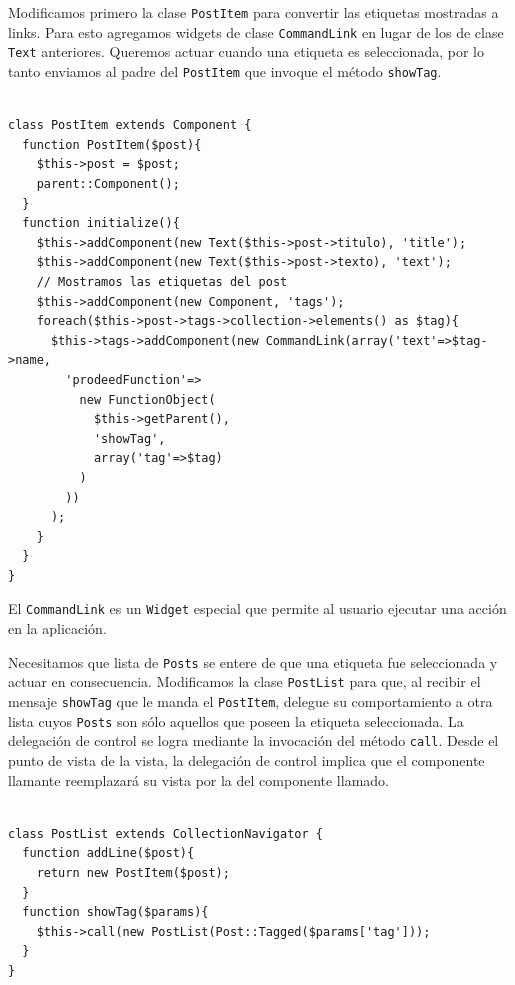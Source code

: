 
Modificamos primero la clase \verb"PostItem" para convertir las etiquetas mostradas a links. Para esto agregamos widgets de clase \verb"CommandLink" en lugar de los de clase \verb"Text" anteriores. Queremos actuar cuando una etiqueta es seleccionada, por lo tanto enviamos al padre del \verb'PostItem' que invoque el método \verb'showTag'.

\begin{verbatim}

class PostItem extends Component {
  function PostItem($post){
    $this->post = $post;
    parent::Component();
  }
  function initialize(){
    $this->addComponent(new Text($this->post->titulo), 'title');
    $this->addComponent(new Text($this->post->texto), 'text');
    // Mostramos las etiquetas del post
    $this->addComponent(new Component, 'tags');
    foreach($this->post->tags->collection->elements() as $tag){
      $this->tags->addComponent(new CommandLink(array('text'=>$tag->name,
        'prodeedFunction'=>
          new FunctionObject(
            $this->getParent(),
            'showTag',
            array('tag'=>$tag)
          )
        ))
      );
    }
  }
}

\end{verbatim}

El \verb"CommandLink" es un \verb"Widget" especial que permite al usuario ejecutar una acción en la aplicación.

Necesitamos que lista de \verb"Posts" se entere de que una etiqueta fue seleccionada y actuar en consecuencia. Modificamos la clase \verb"PostList" para que, al recibir el mensaje \verb'showTag' que le manda el \verb'PostItem', delegue su comportamiento a otra lista cuyos \verb"Posts" son sólo aquellos que poseen la etiqueta seleccionada. La delegación de control se logra mediante la invocación del método \verb"call". Desde el punto de vista de la vista, la delegación de control implica que el componente llamante reemplazará su vista por la del componente llamado.

\begin{verbatim}

class PostList extends CollectionNavigator {
  function addLine($post){
    return new PostItem($post);
  }
  function showTag($params){
    $this->call(new PostList(Post::Tagged($params['tag']));
  }
}

\end{verbatim}


